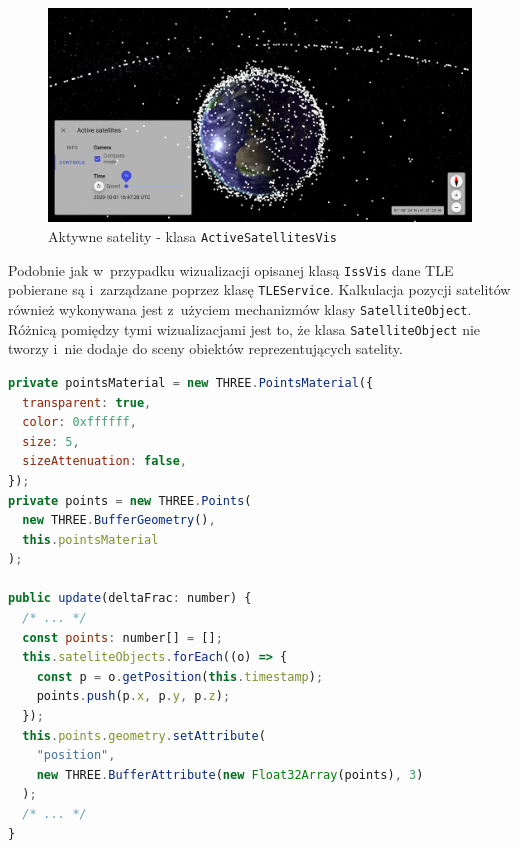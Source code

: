 \begin{figure}
  \centering
  \includegraphics[width=\linewidth]{img/c4_activeSatellitesVis.png}
  \caption{Aktywne satelity - klasa \texttt{ActiveSatellitesVis}}
  \label{fig:c4_activeSatellitesVis} 
\end{figure}

Podobnie jak w~przypadku wizualizacji opisanej klasą \texttt{IssVis} dane TLE pobierane są i~zarządzane poprzez klasę \texttt{TLEService}. Kalkulacja pozycji satelitów również wykonywana jest z~użyciem mechanizmów klasy \texttt{SatelliteObject}. Różnicą pomiędzy tymi wizualizacjami jest to, że klasa \texttt{SatelliteObject} nie tworzy i~nie dodaje do sceny obiektów reprezentujących satelity. 

\begin{lstlisting}[float, language=javascript, label={lst:active1}, caption={
  Fragmenty klasy \texttt{ActiveSatellitesVis}}
]
private pointsMaterial = new THREE.PointsMaterial({
  transparent: true,
  color: 0xffffff,
  size: 5,
  sizeAttenuation: false,
});
private points = new THREE.Points(
  new THREE.BufferGeometry(),
  this.pointsMaterial
);

public update(deltaFrac: number) {
  /* ... */
  const points: number[] = [];
  this.sateliteObjects.forEach((o) => {
    const p = o.getPosition(this.timestamp);
    points.push(p.x, p.y, p.z);
  });
  this.points.geometry.setAttribute(
    "position",
    new THREE.BufferAttribute(new Float32Array(points), 3)
  );
  /* ... */
}
\end{lstlisting}

